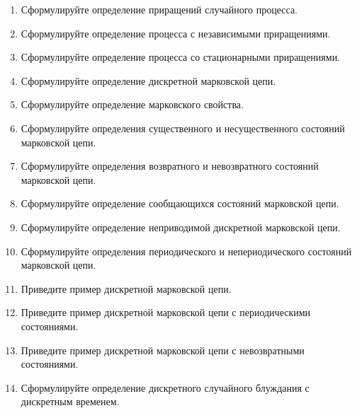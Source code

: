 \documentclass[a4paper,12pt]{extreport}
\renewcommand{\=}[1]{\stackrel{#1}{=}} %
\begin{document}
\begin{enumerate}
	\item Сформулируйте определение приращений случайного процесса.
	\item Сформулируйте определение процесса с независимыми приращениями.
	\item Сформулируйте определение процесса со стационарными приращениями.

	\item Сформулируйте определение дискретной марковской цепи.
	\item Сформулируйте определение марковского свойства.

	\item Сформулируйте определения существенного и несущественного состояний марковской цепи.
	\item Сформулируйте определения возвратного и невозвратного состояний марковской цепи.
	\item Сформулируйте определение сообщающихся состояний марковской цепи.
	\item Сформулируйте определение неприводимой дискретной марковской цепи.
	\item Сформулируйте определения периодического и непериодического состояний марковской цепи.
	\item Приведите пример дискретной марковской цепи.
	\item Приведите пример дискретной марковской цепи с периодическими состояниями.
	\item Приведите пример дискретной марковской цепи с невозвратными состояниями.

	\item Сформулируйте определение дискретного случайного блуждания с дискретным временем.


\end{enumerate}
\end{document}
